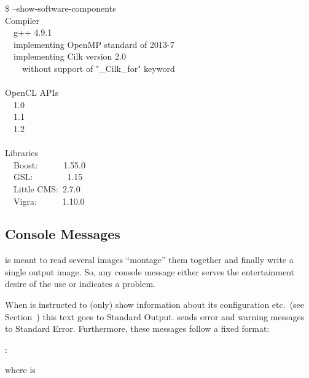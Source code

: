\begin{exemplar}[htbp]
  \centering
  \begin{terminal}
    \$ \app{} --show-software-components \\
    Compiler \\
    ~~g++ 4.9.1 \\
    ~~implementing OpenMP standard of 2013-7 \\
    ~~implementing Cilk version 2.0 \\
    ~~~~without support of "\_Cilk\_for" keyword \\
    ~ \\
    OpenCL APIs \\
    ~~1.0 \\
    ~~1.1 \\
    ~~1.2  \\
    ~ \\
    Libraries \\
    ~~Boost:~~~~~~1.55.0 \\
    ~~GSL:~~~~~~~~1.15 \\
    ~~Little CMS:~2.7.0 \\
    ~~Vigra:~~~~~~1.10.0
  \end{terminal}

  \caption[Output of ]%
          {Output of \appcmd{} when asked to reveal the compile that
            was used to build it along with the libraries it was
            linked against.\label{ex:show-software-components}}
\end{exemplar}


\subsection[Console Messages]{Console Messages
  \label{sec:console-messages}
  }

\App{} is meant to read several images ``montage'' them together and
finally write a single output image.  So, any console message either
serves the entertainment desire of the use or indicates a problem.

When \appcmd{} is instructed to (only) show information about its
configuration etc.\ (see Section~)
this text goes to Standard Output.  \appcmd{} sends error and warning
messages to Standard Error.  Furthermore, these messages follow a
fixed format:
\begin{literal}
  \app:  
\end{literal}
\noindent where  is

